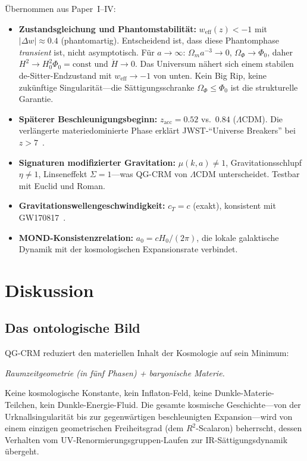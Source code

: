 \documentclass[aps,prd,twocolumn,superscriptaddress,nofootinbib]{revtex4-2}
\begin{document}
Übernommen aus Paper~I--IV:
\begin{itemize}
\item \textbf{Zustandsgleichung und Phantomstabilität:} $w_\mathrm{eff}(z) < -1$ mit $|\Delta w| \approx 0.4$ (phantomartig). Entscheidend ist, dass diese Phantomphase \textit{transient} ist, nicht asymptotisch. Für $a \to \infty$: $\Omega_m a^{-3} \to 0$, $\Omega_\Phi \to \Phi_0$, daher $H^2 \to H_0^2\Phi_0 = \mathrm{const}$ und $\dot{H} \to 0$. Das Universum nähert sich einem stabilen de-Sitter-Endzustand mit $w_\mathrm{eff} \to -1$ von unten. Kein Big Rip, keine zukünftige Singularität---die Sättigungsschranke $\Omega_\Phi \leq \Phi_0$ ist die strukturelle Garantie.
\item \textbf{Späterer Beschleunigungsbeginn:} $z_\mathrm{acc} = 0.52$ vs.\ $0.84$ ($\Lambda$CDM). Die verlängerte materiedominierte Phase erklärt JWST-``Universe Breakers'' bei $z > 7$~\cite{Labbe2023}.
\item \textbf{Signaturen modifizierter Gravitation:} $\mu(k,a) \neq 1$, Gravitationsschlupf $\eta \neq 1$, Linseneffekt $\Sigma = 1$---was QG-CRM von $\Lambda$CDM unterscheidet. Testbar mit Euclid und Roman.
\item \textbf{Gravitationswellengeschwindigkeit:} $c_T = c$ (exakt), konsistent mit GW170817~\cite{GW170817}.
\item \textbf{MOND-Konsistenzrelation:} $a_0 = cH_0/(2\pi)$, die lokale galaktische Dynamik mit der kosmologischen Expansionsrate verbindet.
\end{itemize}


\section{Diskussion}
\label{sec:discussion}

\subsection{Das ontologische Bild}

QG-CRM reduziert den materiellen Inhalt der Kosmologie auf sein Minimum:
\begin{center}
\textit{Raumzeitgeometrie (in fünf Phasen) + baryonische Materie.}
\end{center}
Keine kosmologische Konstante, kein Inflaton-Feld, keine Dunkle-Materie-Teilchen, kein Dunkle-Energie-Fluid. Die gesamte kosmische Geschichte---von der Urknallsingularität bis zur gegenwärtigen beschleunigten Expansion---wird von einem einzigen geometrischen Freiheitsgrad (dem $R^2$-Scalaron) beherrscht, dessen Verhalten vom UV-Renormierungsgruppen-Laufen zur IR-Sättigungsdynamik übergeht.
\end{document}

